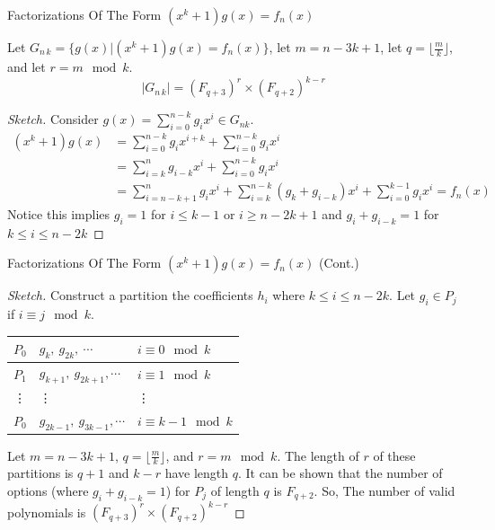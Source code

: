 \documentclass{beamer}
\newcommand{\floor}[2]{\lfloor \frac{#1}{#2} \rfloor}
\begin{document}
    \begin{frame}{Factorizations Of The Form $(x^k+1)g(x)= f_n(x)$}  
        \fontsize{8pt}{2pt}\selectfont
        \begin{theorem}
            Let $G_{n \, k} = \{g(x)|(x^k+1) g(x)=f_n(x)\}$,
            let $m=n-3k+1$,
            let $q = \floor{m}{k}$,
            and let $r= m\mod k$.
            $$|G_{n \, k}| = (F_{q+3})^r \times (F_{q+2})^{k-r}$$
        \end{theorem}
        \begin{proof}[Sketch] 
            Consider $\displaystyle g(x) = \sum_{i=0}^{n-k}g_ix^i \in G_{nk}$.\vspace{-1em}
            \begin{align*}
            (x^k+1) g(x)
                & =  \sum_{i=0}^{n-k}g_i x^{i+k} + \sum_{i=0}^{n-k}g_i x^i\\
                & =  \sum_{i=k}^{n}g_{i-k} x^{i} + \sum_{i=0}^{n-k}g_i x^i\\
                & = \sum_{i=n-k+1}^{n}g_i x^{i} + \sum_{i=k}^{n-k}(g_{k} + g_{i-k}) x^{i} + \sum_{i=0}^{k-1}g_i x^i
                =f_n(x)
            \end{align*}
            Notice this implies $g_i= 1$ for $i \le k-1$ or $i \ge n-2k+1$ and $g_i+g_{i-k} = 1$ for $k \le i \le n-2k$
            \renewcommand{\qedsymbol}{}
        \end{proof}
    \end{frame}
    
    \begin{frame}[shrink=5]{Factorizations Of The Form $(x^k+1)g(x)= f_n(x)$ (Cont.)}
        \begin{proof}[Sketch] 
            Construct a partition the coefficients $h_i$ where $k\le i \le n-2k$.
            Let $g_i \in P_j$ if $i \equiv j \mod k$.
            \begin{table}[h]
                \centering
                \begin{tabular}{|c|ll|}
                \hline 
                    $P_0$ & $g_k, \ g_{2k}, \  \cdots$  & $i \equiv 0 \mod k$ \\ \hline
                    $P_1$ & $g_{k+1}, \ g_{2k+1}, \cdots$  & $i \equiv 1 \mod k$ \\ \hline
                    \vdots & \vdots & \vdots \\ \hline
                    $P_0$ & $g_{2k-1}, \ g_{3k-1}, \cdots$  & $i \equiv k-1 \mod k$ \\ \hline
                \end{tabular}
            \end{table}
            Let $m = n-3k+1$, $q= \floor{m}{k}$, and $r = m \mod k$. The length of $r$ of these partitions is $q+1$ and $k-r$ have length $q$.
            It can be shown that the number of options (where $g_i+g_{i-k}=1$) for $P_j$ of length $q$ is $F_{q+2}$.
            So, The number of valid polynomials is $(F_{q+3})^r \times (F_{q+2})^{k-r}$
            \renewcommand{\qedsymbol}{$\square$}
        \end{proof}
    \end{frame}
\end{document}
